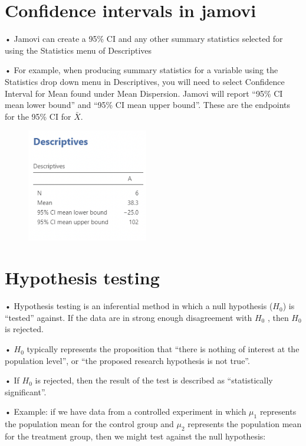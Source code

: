 \documentclass[
  letterpaper,
  DIV=11,
  numbers=noendperiod]{scrreprt}
\begin{document}
\hypertarget{confidence-intervals-in-jamovi}{%
\section{Confidence intervals in
jamovi}\label{confidence-intervals-in-jamovi}}

• Jamovi can create a 95\% CI and any other summary statistics selected
for using the Statistics menu of Descriptives

• For example, when producing summary statistics for a variable using
the Statistics drop down menu in Descriptives, you will need to select
Confidence Interval for Mean found under Mean Dispersion. Jamovi will
report ``95\% CI mean lower bound'' and ``95\% CI mean upper bound''.
These are the endpoints for the 95\% CI for \(\bar{X}\).

\begin{figure}

\hfill{} \includegraphics[width=2.08333in,height=\textheight]{images/mod1_10.png}

\end{figure}

\hypertarget{hypothesis-testing}{%
\section{Hypothesis testing}\label{hypothesis-testing}}

• Hypothesis testing is an inferential method in which a null hypothesis
(\(H_0\)) is ``tested'' against. If the data are in strong enough
disagreement with \(H_0\) , then \(H_0\) is rejected.

• \(H_0\) typically represents the proposition that ``there is nothing
of interest at the population level'', or ``the proposed research
hypothesis is not true''.

• If \(H_0\) is rejected, then the result of the test is described as
``statistically significant''.

• Example: if we have data from a controlled experiment in which
\(\mu_1\) represents the population mean for the control group and
\(\mu_2\) represents the population mean for the treatment group, then
we might test against the null hypothesis:
\end{document}
